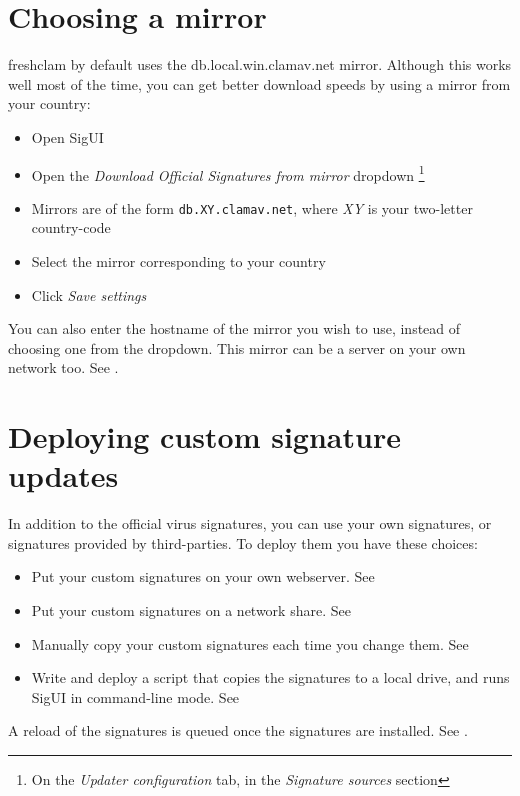 \section{Choosing a mirror}
\label{sec:mirror}
\Gls{freshclam} by default uses the \gls{db.local.win.clamav.net} \gls{mirror}. Although this works well most of the time, you can get better download speeds by using a mirror from your country:
\begin{itemize}
\item Open SigUI
\item Open the \emph{Download Official Signatures from mirror} dropdown \footnote{
On the \emph{Updater configuration} tab, in the \emph{Signature sources} section}
\item Mirrors are of the form \texttt{db.XY.clamav.net}, where \emph{XY} is your two-letter country-code
\item Select the mirror corresponding to your country
\item Click \emph{Save settings}
\end{itemize}

You can also enter the \gls{hostname} of the mirror you wish to use, instead of choosing one from the dropdown. 
This mirror can be a server on your own network too. See .

\section{Deploying custom signature updates}
\label{sec:customsigs}
In addition to the official virus signatures, you can use your own signatures, or signatures provided by third-parties.
To deploy them you have these choices:
\begin{itemize}
 \item Put your custom signatures on your own webserver. See 
 \item Put your custom signatures on a network share. See 
 \item Manually copy your custom signatures each time you change them. See 
 \item Write and deploy a script that copies the signatures to a local drive, and runs SigUI in command-line mode. See 
\end{itemize}

A reload of the signatures is queued once the signatures are installed. See .

